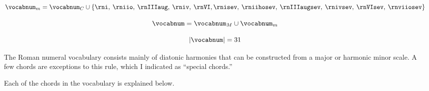 \begin{equation}
    \vocabnum_{m} = \vocabnum_{C} \cup  \{ \rni, \: \rniio, \: 
    \rnIIIaug, \: \rniv, \: \rnVI, \rnisev, \: \rniihosev, \: 
    \rnIIIaugsev, \: \rnivsev, \: \rnVIsev, \: \rnviiosev \}
\end{equation}

\begin{equation}
    \vocabnum = \vocabnum_{M} \cup \vocabnum_{m}
\end{equation}

\begin{equation}
    | \vocabnum | = 31
\end{equation}

                

The Roman numeral vocabulary consists mainly of diatonic
harmonies that can be constructed from a major or harmonic
minor scale. A few chords are exceptions to this rule, \:
which I indicated as ``special chords.''

Each of the chords in the vocabulary is explained below.


